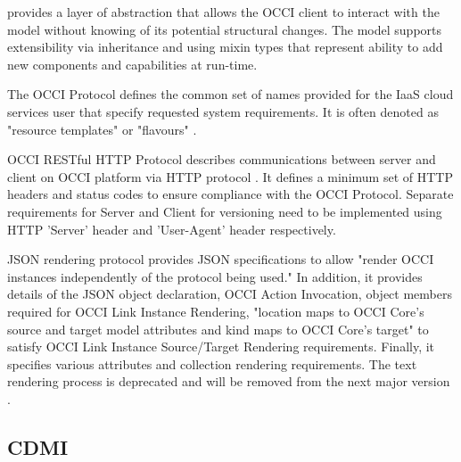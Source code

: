      provides a layer of abstraction that allows the OCCI client
     to interact with the model without knowing of its potential
     structural changes. The model supports extensibility via
     inheritance and using mixin types that represent ability to
     add new components and capabilities at run-time.
     \cite{nyren-edmonds-papaspyrou-2016}

     The OCCI Protocol defines the common set of names provided
     for the IaaS cloud services user that specify requested
     system requirements. It is often denoted as "resource
     templates" or "flavours"   \cite{drescher-parak-wallom-2015}.

     OCCI RESTful HTTP Protocol describes communications between
     server and client on OCCI platform via HTTP protocol
     \cite{nyren-edmonds-metsch-2016}. It defines a minimum set of HTTP
     headers and status codes to ensure compliance with the
     OCCI Protocol. Separate requirements for Server and Client
     for versioning need to be implemented using HTTP 'Server'
     header and 'User-Agent' header respectively.

     JSON rendering  \cite{nyren-feldhaus-parak-2016} protocol provides
     JSON specifications to allow "render OCCI instances
     independently of the protocol being used." In addition, it
     provides details of the JSON object declaration, OCCI Action
     Invocation, object members required for OCCI Link Instance
     Rendering, "location maps to OCCI Core's source and target
     model attributes and kind maps to OCCI Core's target" to
     satisfy OCCI Link Instance Source/Target Rendering requirements.
     Finally, it specifies various attributes and collection
     rendering requirements.
     The text rendering process is deprecated and will be
     removed from the next major version  \cite{edmonds-metsch-2016}.
	 
\subsection{ CDMI}


